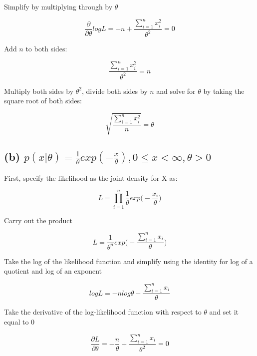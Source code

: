\documentclass{article}
\begin{document}
\noindent Simplify by multiplying through by $\theta$

\begin{equation}
\frac{\partial}{\partial \theta} log L = -n + \frac{ \sum\limits_{i = 1}^{n} x_i^2}{\theta^2} = 0
\end{equation}

\noindent Add $n$ to both sides:

\begin{equation}
\frac{\sum\limits_{i = 1}^{n} x_i^2}{\theta^2} = n
\end{equation}

\noindent Multiply both sides by $\theta^2$, divide both sides by $n$ and solve for $\theta$ by taking the square root of both sides:

\begin{equation}
\sqrt{ \frac{ \sum\limits_{i = 1}^n x_i^2 }{n} } = \theta
\end{equation}

\subsection{(b) $p(x|\theta) = \frac{1}{\theta} exp (- \frac{x}{\theta}), 0 \leq x  < \infty, \theta > 0$}

\noindent First, specify the likelihood as the joint density for X as:

\begin{equation}
L = \prod\limits_{i = 1}^{n} \frac{1}{\theta} exp\Big(- \frac{x_i}{\theta} \Big)
\end{equation}

\noindent Carry out the product

\begin{equation}
L = \frac{1}{\theta^n} exp\Bigg(- \frac{\sum\limits_{i = 1}^n  x_i}{\theta} \Bigg)
\end{equation}

\noindent Take the log of the likelihood function and simplify using the identity for log of a quotient and log of an exponent

\begin{equation}
log L = - n log \theta - \frac{\sum\limits_{i = 1}^n  x_i}{\theta}
\end{equation}

\noindent Take the derivative of the log-likelihood function with respect to $\theta$ and set it equal to $0$

\begin{equation}
\frac{ \partial L}{ \partial \theta} =  - \frac{n}{\theta} + \frac{\sum\limits_{i = 1}^n x_i}{\theta^2} = 0
\end{equation}
\end{document}
